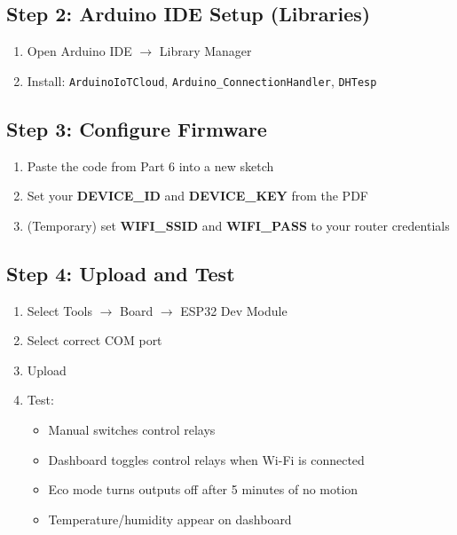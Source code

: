 \documentclass[12pt,a4paper]{article}
\begin{document}
\subsection{Step 2: Arduino IDE Setup (Libraries)}
\begin{enumerate}
\item Open Arduino IDE $\rightarrow$ Library Manager
\item Install: \texttt{ArduinoIoTCloud}, \texttt{Arduino\_ConnectionHandler}, \texttt{DHTesp}
\end{enumerate}

\subsection{Step 3: Configure Firmware}
\begin{enumerate}
\item Paste the code from Part 6 into a new sketch
\item Set your \textbf{DEVICE\_ID} and \textbf{DEVICE\_KEY} from the PDF
\item (Temporary) set \textbf{WIFI\_SSID} and \textbf{WIFI\_PASS} to your router credentials
\end{enumerate}

\subsection{Step 4: Upload and Test}
\begin{enumerate}
\item Select Tools $\rightarrow$ Board $\rightarrow$ ESP32 Dev Module
\item Select correct COM port
\item Upload
\item Test:
\begin{itemize}
\item Manual switches control relays
\item Dashboard toggles control relays when Wi-Fi is connected
\item Eco mode turns outputs off after 5 minutes of no motion
\item Temperature/humidity appear on dashboard
\end{itemize}
\end{enumerate}
\end{document}
